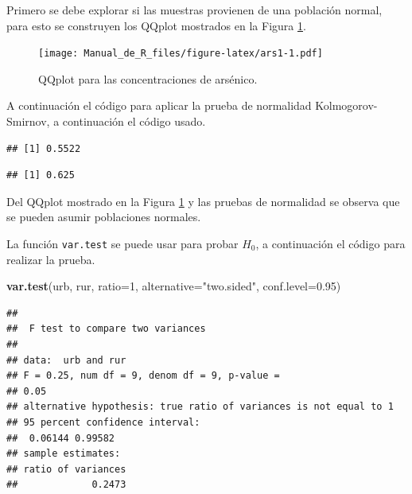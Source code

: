 \documentclass[10pt,]{krantz}
\makeatletter
\newenvironment{Shaded}{\begin{snugshade}}{\end{snugshade}}
\newcommand{\KeywordTok}[1]{\textcolor[rgb]{0.13,0.29,0.53}{\textbf{#1}}}
\newcommand{\DataTypeTok}[1]{\textcolor[rgb]{0.13,0.29,0.53}{#1}}
\newcommand{\DecValTok}[1]{\textcolor[rgb]{0.00,0.00,0.81}{#1}}
\newcommand{\FloatTok}[1]{\textcolor[rgb]{0.00,0.00,0.81}{#1}}
\newcommand{\StringTok}[1]{\textcolor[rgb]{0.31,0.60,0.02}{#1}}
\newcommand{\CommentTok}[1]{\textcolor[rgb]{0.56,0.35,0.01}{\textit{#1}}}
\newcommand{\OperatorTok}[1]{\textcolor[rgb]{0.81,0.36,0.00}{\textbf{#1}}}
\newcommand{\NormalTok}[1]{#1}
\newenvironment{kframe}{%
\medskip{}
\setlength{\fboxsep}{.8em}
 \def\at@end@of@kframe{}%
 \ifinner\ifhmode%
  \def\at@end@of@kframe{\end{minipage}}%
  \begin{minipage}{\columnwidth}%
 \fi\fi%
 \def\FrameCommand##1{\hskip\@totalleftmargin \hskip-\fboxsep
 \colorbox{shadecolor}{##1}\hskip-\fboxsep
     \hskip-\linewidth \hskip-\@totalleftmargin \hskip\columnwidth}%
 \MakeFramed {\advance\hsize-\width
   \@totalleftmargin\z@ \linewidth\hsize
   \@setminipage}}%
 {\par\unskip\endMakeFramed%
 \at@end@of@kframe}
\renewenvironment{Shaded}{\begin{kframe}}{\end{kframe}}
\makeatother
\begin{document}
Primero se debe explorar si las muestras provienen de una población
normal, para esto se construyen los QQplot mostrados en la Figura
\ref{fig:ars1}.

\begin{figure}
\centering
\texttt{[image: Manual\_de\_R\_files/figure-latex/ars1-1.pdf]}
\caption{\label{fig:ars1}QQplot para las concentraciones de arsénico.}
\end{figure}

A continuación el código para aplicar la prueba de normalidad
Kolmogorov-Smirnov, a continuación el código usado.

\begin{Shaded}
\end{Shaded}

\begin{verbatim}
## [1] 0.5522
\end{verbatim}

\begin{Shaded}
\end{Shaded}

\begin{verbatim}
## [1] 0.625
\end{verbatim}

Del QQplot mostrado en la Figura \ref{fig:ars1} y las pruebas de
normalidad se observa que se pueden asumir poblaciones normales.

La función \texttt{var.test} se puede usar para probar \(H_0\), a
continuación el código para realizar la prueba.

\begin{Shaded}
\begin{Highlighting}[]
\KeywordTok{var.test}\NormalTok{(urb, rur, }\DataTypeTok{ratio=}\DecValTok{1}\NormalTok{, }\DataTypeTok{alternative=}\StringTok{"two.sided"}\NormalTok{,}
         \DataTypeTok{conf.level=}\FloatTok{0.95}\NormalTok{)}
\end{Highlighting}
\end{Shaded}

\begin{verbatim}
## 
##  F test to compare two variances
## 
## data:  urb and rur
## F = 0.25, num df = 9, denom df = 9, p-value =
## 0.05
## alternative hypothesis: true ratio of variances is not equal to 1
## 95 percent confidence interval:
##  0.06144 0.99582
## sample estimates:
## ratio of variances 
##             0.2473
\end{verbatim}
\end{document}
